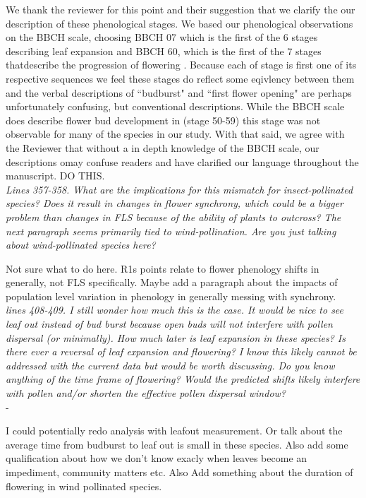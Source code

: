\documentclass[11pt]{article}
\begin{document}
We thank the reviewer for this point and their suggestion that we clarify the our description of these phenological stages. We based our phenological observations on the BBCH scale, choosing BBCH 07 which is the first of the 6 stages describing leaf expansion and BBCH 60, which is the first of the 7 stages thatdescribe the progression of flowering \citep{}. Because each of stage is first one of its respective sequences we feel these stages do reflect some eqivlency between them and the verbal descriptions of ``budburst" and ``first flower opening" are perhaps unfortunately confusing, but conventional descriptions. While the BBCH scale does describe flower bud development in (stage 50-59) this stage was not observable for many of the species in our study. With that said, we agree with the Reviewer that without a in depth knowledge of the BBCH scale, our descriptions omay confuse readers and have clarified our language throughout the manuscript. DO THIS.\\




\emph{Lines  357-358. What are the implications for this mismatch for insect-pollinated species? Does it result in changes in flower synchrony, which could be a bigger problem than changes in FLS because of the ability of plants to outcross? The next paragraph seems primarily tied to wind-pollination. Are you just talking about wind-pollinated species here?}
 
Not sure what to do here. R1s points relate to flower phenology shifts in generally, not FLS specifically. Maybe add a paragraph about the impacts of population level variation in phenology in generally messing with synchrony.\\
 
\emph{lines 408-409. I still wonder how much this is the case. It would be nice to see leaf out instead of bud burst because open buds will not interfere with pollen dispersal (or minimally). How much later is leaf expansion in these species? Is there ever a reversal of leaf expansion and flowering? I know this likely cannot be addressed with the current data but would be worth discussing. Do you know anything of the time frame of flowering? Would the predicted shifts likely interfere with pollen and/or shorten the effective pollen dispersal window?}\\

-

I could potentially redo analysis with leafout measurement. Or talk about the average time from budburst to leaf out is small in these species. Also add some qualification about how we don't know exacly when leaves become an impediment, community matters etc. Also Add something about the duration of flowering in wind pollinated species.\\
\end{document}
